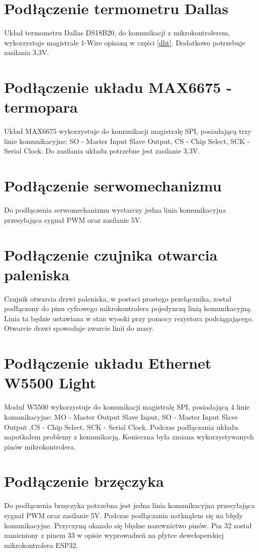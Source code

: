 \documentclass[11pt]{report}
\begin{document}
 \section{Podłączenie termometru Dallas}
 Układ termometru Dallas DS18B20, do komunikacji z mikrokontrolerem, wykorzystuje magistrale 1-Wire opisaną w części \ref{dht}. Dodatkowo potrzebuje zasilania 3,3V.
 
 \section{Podłączenie układu MAX6675 - termopara}
 Układ MAX6675 wykorzystuje do komunikacji magistralę SPI, posiadającą trzy linie komunikacyjne: SO - Master Input Slave Output, CS - Chip Select, SCK - Serial Clock. Do zasilania układu potrzebne jest zasilanie 3,3V.
 
 \section{Podłączenie serwomechanizmu}
 Do podłączenia serwomechanizmu wystarczy jedna linia komunikacyjna przesyłająca sygnał PWM oraz zasilanie 5V.
 
 \section{Podłączenie czujnika otwarcia paleniska}
 Czujnik otwarcia drzwi paleniska, w postaci prostego przełącznika, został podłączony do pinu cyfrowego mikrokontrolera pojedynczą linią komunikacyjną. Linia ta będzie ustawiana w stan wysoki przy pomocy rezystora podciągającego. Otwarcie drzwi spowoduje zwarcie linii do masy. 
 
  \section{Podłączenie układu Ethernet W5500 Light}
 Moduł W5500 wykorzystuje do komunikacji magistralę SPI, posiadającą 4 linie komunikacyjne: MO - Master Output Slave Input, SO - Master Input Slave Output ,CS - Chip Select, SCK - Serial Clock.
 Podczas podłączania układu napotkałem problemy z komunikacją. Konieczna była zmiana wykorzystywanych pinów mikrokontrolera.
 
 \section{Podłączenie brzęczyka}
 Do podłączenia brzęczyka potrzebna jest jedna linia komunikacyjna przesyłająca sygnał PWM oraz zasilanie 5V. 
 Podczas podłączania natknąłem się na błędy komunikacyjne. Przyczyną okazało się błędne nazewnictwo pinów. Pin 32 został zamieniony z pinem 33 w opisie wyprowadzeń na płytce deweloperskiej mikrokontrolera ESP32.
 
\end{document}
